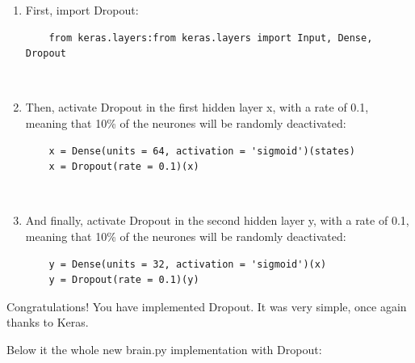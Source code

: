 \documentclass[]{book}
\begin{document}
\begin{enumerate}
    \item First, import Dropout:
    \begin{lstlisting}
    from keras.layers:from keras.layers import Input, Dense, Dropout
    \end{lstlisting}
    \
    \item Then, activate Dropout in the first hidden layer x, with a rate of 0.1, meaning that 10\% of the neurones will be randomly deactivated:
    \begin{lstlisting}
    x = Dense(units = 64, activation = 'sigmoid')(states)
    x = Dropout(rate = 0.1)(x)
    \end{lstlisting}
    \
    \item And finally, activate Dropout in the second hidden layer y, with a rate of 0.1, meaning that 10\% of the neurones will be randomly deactivated:
    \begin{lstlisting}
    y = Dense(units = 32, activation = 'sigmoid')(x)
    y = Dropout(rate = 0.1)(y)
    \end{lstlisting}
\end{enumerate}

Congratulations! You have implemented Dropout. It was very simple, once again thanks to Keras.

Below it the whole new brain.py implementation with Dropout:
\end{document}
